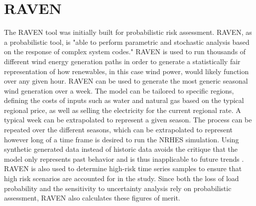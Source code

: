 \documentclass[12pt]{UIdahoMastersThesis}
\begin{document}
\section{RAVEN}
The RAVEN tool was initially built for probabilistic risk assessment. RAVEN, as a probabilistic tool, is "able to perform parametric and stochastic analysis based on the response of complex system codes\cite{RabitiRAVEN}." RAVEN is used to run thousands of different wind energy generation paths in order to generate a statistically fair representation of how renewables, in this case wind power, would likely function over any given hour. RAVEN can be used to generate the most generic seasonal wind generation over a week. The model can be tailored to specific regions, defining the costs of inputs such as water and natural gas based on the typical regional price, as well as selling the electricity for the current regional rate. A typical week can be extrapolated to represent a given season. The process can be repeated over the different seasons, which can be extrapolated to represent however long of a time frame is desired to run the NRHES simulation. Using synthetic generated data instead of historic data avoids the critique that the model only represents past behavior and is thus inapplicable to future trends \cite{redfoot_epiney_2016}. RAVEN is also used to determine high-risk time series samples to ensure that high risk scenarios are accounted for in the study. Since both the loss of load probability and the sensitivity to uncertainty analysis rely on probabilistic assessment, RAVEN also calculates these figures of merit.
\end{document}
